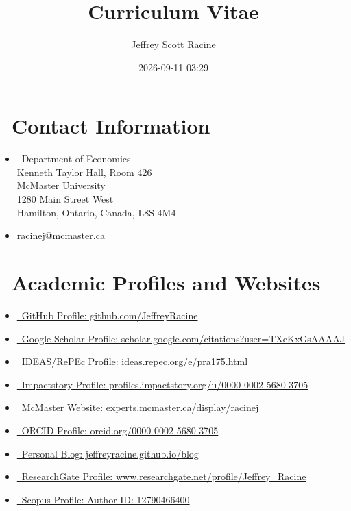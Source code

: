 \documentclass[
]{article}
\title{Curriculum Vitae}
\author{Jeffrey Scott Racine}
\date{2026-09-11 03:29}
\begin{document}
\maketitle


\section*{\texorpdfstring{\faHome~Contact
Information}{~Contact Information}}\label{contact-information}

\begin{itemize}
\item
  \faPaperPlane~Department of Economics\\
  Kenneth Taylor Hall, Room 426\\
  McMaster University\\
  1280 Main Street West\\
  Hamilton, Ontario, Canada, L8S 4M4
\item
  \href{mailto:racinej@mcmaster.ca}{\faEnvelope} racinej@mcmaster.ca
\end{itemize}

\section*{\texorpdfstring{\faGlobeAmericas~Academic Profiles and
Websites}{~Academic Profiles and Websites}}\label{academic-profiles-and-websites}

\begin{itemize}
\item
  \href{https://github.com/JeffreyRacine}{\faGithub~GitHub Profile:
  github.com/JeffreyRacine}
\item
  \href{https://scholar.google.com/citations?user=TXeKxGsAAAAJ}{\aiGoogleScholar~Google
  Scholar Profile: scholar.google.com/citations?user=TXeKxGsAAAAJ}
\item
  \href{https://ideas.repec.org/e/pra175.html}{\aiIDEASRePEc~IDEAS/RePEc
  Profile: ideas.repec.org/e/pra175.html}
\item
  \href{https://profiles.impactstory.org/u/0000-0002-5680-3705}{\aiImpactstory~Impactstory
  Profile: profiles.impactstory.org/u/0000-0002-5680-3705}
\item
  \href{https://experts.mcmaster.ca/display/racinej}{\faUniversity~McMaster
  Website: experts.mcmaster.ca/display/racinej}
\item
  \href{https://orcid.org/0000-0002-5680-3705}{\aiOrcid~ORCID Profile:
  orcid.org/0000-0002-5680-3705}
\item
  \href{https://jeffreyracine.github.io/blog}{\faBlog~Personal Blog:
  jeffreyracine.github.io/blog}
\item
  \href{https://www.researchgate.net/profile/Jeffrey_Racine}{\aiResearchGate~ResearchGate
  Profile: www.researchgate.net/profile/Jeffrey\_Racine}
\item
  \href{https://www.scopus.com/authid/detail.uri?authorId=12790466400}{\faGlobeAmericas~Scopus
  Profile: Author ID: 12790466400}
\end{itemize}
\end{document}
